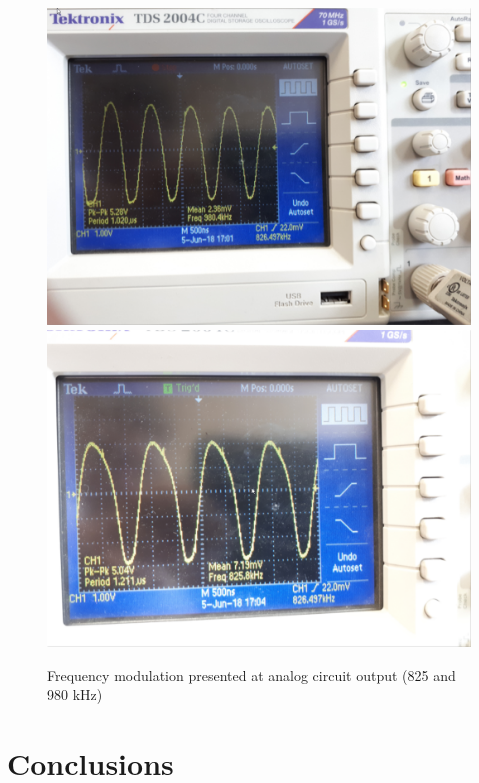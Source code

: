 \documentclass[eng,printmode, openany]{mgr}
\begin{document}
\begin{figure}
	\centering
	\includegraphics[width=0.7\linewidth]{output1}
	\vspace{20pt}
	\includegraphics[width=0.7\linewidth]{output2}
	\caption{Frequency modulation presented at analog circuit output (825 and 980 kHz)}
	\label{fig:output1}
	
\end{figure}

\chapter{Conclusions}

\begin{thebibliography}{9}

\end{thebibliography}
	
\end{document}

